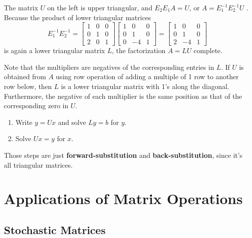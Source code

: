 \documentclass{article}
\newcommand\B{\textbf}
\begin{document}
    The matrix $U$ on the left is upper triangular, and $E_2E_1A = U$, or $A = E_1^{-1}E_2^{-1}U$ . Because
    the product of lower triangular matrices 
    \[ E_1^{-1}E_2^{-1} = \begin{bmatrix}
            1 & 0 & 0 \\
            0 & 1 & 0 \\
            2  & 0 & 1
        \end{bmatrix}\begin{bmatrix}
            1 & 0 & 0 \\
            0 & 1 & 0 \\
            0 & -4 & 1
        \end{bmatrix} = \begin{bmatrix}
            1 & 0 & 0 \\
            0 & 1 & 0 \\
            2 & -4 & 1
        \end{bmatrix} \]
    is again a lower triangular matrix $L$, the factorization $A = LU$ complete.
    
    Note that the multipliers are negatives of the corresponding entries in $L$. If
    $U$ is obtained from $A$ using row operation of adding a multiple of 1 row to 
    another row below, then $L$ is a lower triangular matrix with 1's along the 
    diagonal. Furthermore, the negative of each multiplier is the same position
    as that of the corresponding zero in $U$.

    \begin{enumerate}
        \item Write $y = Ux $ and solve $Ly = b$ for $y$.
        \item Solve $Ux = y$ for $x$.
    \end{enumerate}
    Those steps are just \B{forward-substitution} and \B{back-substitution}, since it's
    all triangular matrices.

    \section{Applications of Matrix Operations}

    \subsection{Stochastic Matrices}
\end{document}
